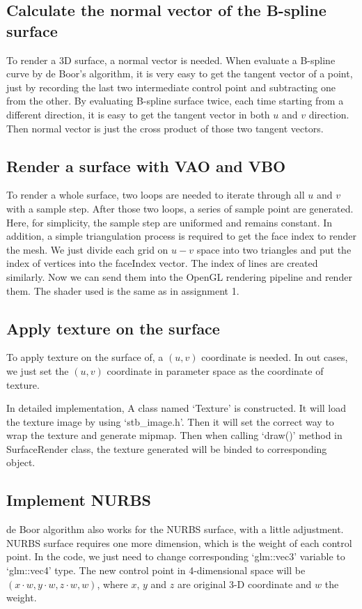 \documentclass[acmtog]{acmart}
\begin{document}
\subsection{Calculate the normal vector of the B-spline surface}
To render a 3D surface, a normal vector is needed. When evaluate a B-spline curve by de Boor's algorithm, it is very easy to get the tangent vector of a point, just by recording the last two intermediate control point and subtracting one from the other. By evaluating B-spline surface twice, each time starting from a different direction, it is easy to get the tangent vector in both $u$ and $v$ direction. Then normal vector is just the cross product of those two tangent vectors.

\subsection{Render a surface with VAO and VBO}
To render a whole surface, two loops are needed to iterate through all $u$ and $v$ with a sample step. After those two loops, a series of sample point are generated. Here, for simplicity, the sample step are uniformed and remains constant. In addition, a simple triangulation process is required to get the face index to render the mesh. We just divide each grid on $u-v$ space into two triangles and put the index of vertices into  the faceIndex vector. The index of lines are created similarly. Now we can send them into the OpenGL rendering pipeline and render them. The shader used is the same as in assignment 1.

\subsection{Apply texture on the surface}
To apply texture on the surface of, a $(u, v)$ coordinate is needed. In out cases, we just set the $(u,v)$ coordinate in parameter space as the coordinate of texture.

In detailed implementation, A class named `Texture' is constructed. It will load the texture image by using `stb\_image.h'. Then it will set the correct way to wrap the texture and generate mipmap. Then when calling `draw()' method in SurfaceRender class, the texture generated will be binded to corresponding object.

\subsection{Implement NURBS}
de Boor algorithm also works for the NURBS surface, with a little adjustment. NURBS surface requires one more dimension, which is the weight of each control point. In the code, we just need to change corresponding `glm::vec3' variable to `glm::vec4' type. The new control point in 4-dimensional space will be $(x\cdot w, y\cdot w, z\cdot w, w)$, where $x$, $y$ and $z$ are original 3-D coordinate and $w$ the weight.
\end{document}
